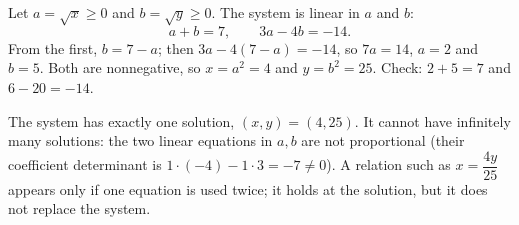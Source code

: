 Let $a=\sqrt x\ge0$ and $b=\sqrt y\ge0$. The system is linear in $a$ and $b$:
\[
a+b=7,\qquad 3a-4b=-14 .
\]
From the first, $b=7-a$; then $3a-4(7-a)=-14$, so $7a=14$, $a=2$ and $b=5$. Both are nonnegative, so $x=a^2=4$ and $y=b^2=25$. Check: $2+5=7$ and $6-20=-14$.

The system has exactly one solution, $\boxed{(x,y)=(4,25)}$. It cannot have infinitely many solutions: the two linear equations in $a,b$ are not proportional (their coefficient determinant is $1\cdot(-4)-1\cdot3=-7\ne0$). A relation such as $x=\dfrac{4y}{25}$ appears only if one equation is used twice; it holds at the solution, but it does not replace the system.
